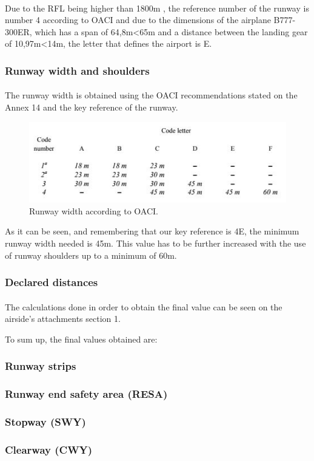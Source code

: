 		\paragraph{}Due to the RFL being higher than 1800m , the reference number of the runway is number 4 according to OACI and due to the dimensions of the airplane B777-300ER, which has a span of 64,8m<65m and a distance between the landing gear of 10,97m<14m, the letter that defines the airport is E.
			
			\subsubsection{Runway width and shoulders}
			\paragraph{}The runway width is obtained using the OACI recommendations stated on the Annex 14 and the key reference of the runway. 
			
			\begin{figure}[H]
				\centering
				\includegraphics[clip, trim=0cm 0cm 0cm 0cm, width=1\textwidth]{./images/Annex14/RunwayWidth}
				\caption{Runway width according to OACI.} %
				\label{} %
			\end{figure}
		
			As it can be seen, and remembering that our key reference is 4E, the minimum runway width needed is 45m. This value has to be further increased with the use of runway shoulders up to a minimum of 60m. 

			\subsubsection{Declared distances}
			\paragraph{} The calculations done in order to obtain the final value can be seen on the airside’s attachments section 1. 
			
			To sum up, the final values obtained are:
			
			\subsubsection{Runway strips}
			\subsubsection{Runway end safety area (RESA)}
			\subsubsection{Stopway (SWY)}
			\subsubsection{Clearway (CWY)}
		